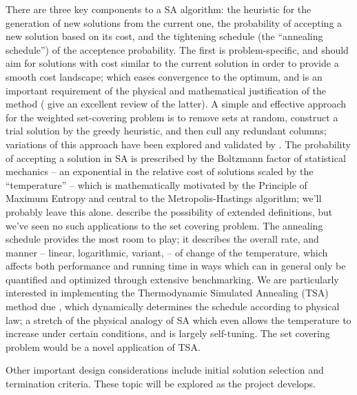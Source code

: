 There are three key components to a SA algorithm: the heuristic for the generation of new solutions from the current one, the probability of accepting a new solution based on its cost, and the tightening schedule (the ``annealing schedule'') of the acceptence probability. The first is problem-specific, and should aim for solutions with cost similar to the current solution in order to provide a smooth cost landscape; which eases convergence to the optimum, and is an important requirement of the physical and mathematical justification of the method (\cite{metaheurbook} give an excellent review of the latter). A simple and effective approach for the weighted set-covering problem is to remove sets at random, construct a trial solution by the greedy heuristic, and then cull any redundant columns; variations of this approach have been explored and validated by \cite{JacobsBrusco}. The probability of accepting a solution in SA is prescribed by the Boltzmann factor of statistical mechanics %
-- an exponential in the relative cost of solutions scaled by the ``temperature'' -- which is mathematically motivated by the Principle of Maximum Entropy and central to the Metropolis-Hastings algorithm; we'll probably leave this alone. \cite{qc174.8.m49} describe the possibility of extended definitions, but we've seen no such applications to the set covering problem. The annealing schedule provides the most room to play; it describes the overall rate, and manner -- linear, logarithmic, variant, \etc -- of change of the temperature, which affects both performance and running time in ways which can in general only be quantified and optimized through extensive benchmarking. We are particularly interested in implementing the Thermodynamic Simulated Annealing (TSA) method due \cite{thermoSA}, which dynamically determines the schedule according to physical law; a stretch of the physical analogy of SA which even allows the temperature to increase under certain conditions, and is largely self-tuning. The set covering problem would be a novel application of TSA.

Other important design considerations include initial solution selection and termination criteria. These topic will be explored as the project develops.
